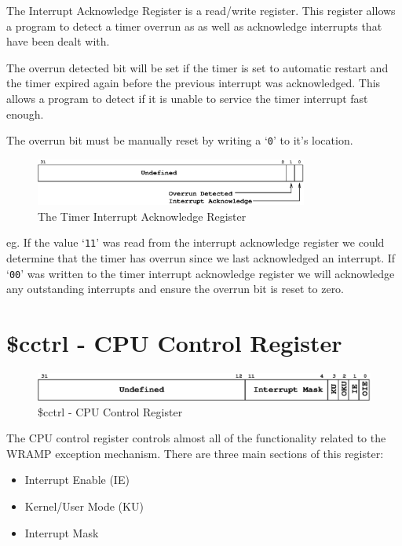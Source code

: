 \documentclass[a4paper,10pt]{article}
\begin{document}
The Interrupt Acknowledge Register is a read/write register. This
register allows a program to detect a timer overrun as as well as
acknowledge interrupts that have been dealt with.

The overrun detected bit will be set if the timer is set to automatic
restart and the timer expired again before the previous interrupt was
acknowledged. This allows a program to detect if it is unable to
service the timer interrupt fast enough.

The overrun bit must be manually reset by writing a `\texttt{0}' to
it's location.

\begin{figure}[h]
\begin{center}
\includegraphics[width=0.8\textwidth]{timer_iack.eps}
\caption{The Timer Interrupt Acknowledge Register}
\label{timer_iack_pic}
\end{center}
\end{figure}

eg. If the value `\texttt{11}' was read from the interrupt acknowledge
register we could determine that the timer has overrun since we last
acknowledged an interrupt. If `\texttt{00}' was written to the timer
interrupt acknowledge register we will acknowledge any outstanding
interrupts and ensure the overrun bit is reset to zero.


\newpage
\section{\$cctrl - CPU Control Register}
\label{appen:cctrl}
\begin{figure}[h]
\begin{center}
\includegraphics[width=\textwidth]{cctrl.eps}
\caption{\$cctrl - CPU Control Register}
\label{cctrl_pic}
\end{center}
\end{figure}

The CPU control register controls almost all of the functionality
related to the WRAMP exception mechanism. There are three main
sections of this register:

\begin{itemize}
\item Interrupt Enable (IE)
\item Kernel/User Mode (KU)
\item Interrupt Mask
\end{itemize}
\end{document}
